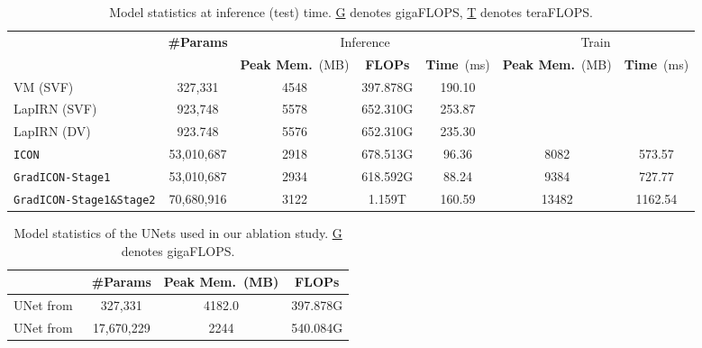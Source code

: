 \begin{table*}[h!]
	\begin{small}
		\centering
		\vspace{\baselineskip}
		\begin{tabular}{lcccccc}\toprule
                                              & \multirow{2}{*}{\bf \#Params} & \multicolumn{3}{c}{Inference} & \multicolumn{2}{c}{Train} \\ \cmidrule{3-7}
			                                 &  & \textbf{Peak Mem.}~(MB) & \textbf{FLOPs} & \textbf{Time}~(ms) & \textbf{Peak Mem.}~(MB) & \textbf{Time}~(ms) \\ \midrule
			VM (SVF)                         & 327,331      & 4548                    & 397.878G       & 190.10  & \textemdash       & \textemdash            \\
			LapIRN (SVF)                     & 923,748      & 5578                    & 652.310G       & 253.87  & \textemdash       & \textemdash            \\
			LapIRN (DV)                      & 923.748      & 5576                    & 652.310G       & 235.30  & \textemdash       & \textemdash            \\
			\texttt{ICON}                    & 53,010,687   & 2918                    & 678.513G       & 96.36   & 8082              & 573.57                 \\
			\texttt{GradICON-Stage1}         & 53,010,687   & 2934                    & 618.592G       & 88.24   & 9384              & 727.77                 \\
			\texttt{GradICON-Stage1\&Stage2} & 70,680,916   & 3122                    & 1.159T         & 160.59  & 13482                & 1162.54                     \\
			\bottomrule
		\end{tabular}
		\caption{Model statistics at inference (test) time. \underline{G} denotes gigaFLOPS, \underline{T} denotes teraFLOPS.}
		\label{tab:model_statistics_lung}
	\end{small}
\end{table*}
\begin{table*}[htp]
	\centering
	\begin{small}
		\vspace{\baselineskip}
		\begin{tabular}{lccc}\toprule
			                                            & \bf \#Params & \textbf{Peak Mem.}~(MB) & \textbf{FLOPs} \\ \midrule
			UNet from~\cite{balakrishnan2019voxelmorph} & 327,331      & 4182.0                  & 397.878G       \\
			UNet from~\cite{greer2021icon}              & 17,670,229   & 2244                    & 540.084G       \\
			\bottomrule
		\end{tabular}
		\caption{Model statistics of the UNets used in our ablation study. \underline{G} denotes gigaFLOPS.}
		\label{tab:model_statistics_unet}
	\end{small}
\end{table*}


